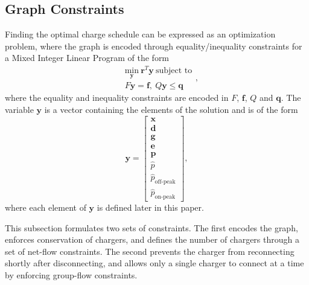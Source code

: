 \subsection{Graph Constraints}
\par Finding the optimal charge schedule can be expressed as an optimization problem, where the graph is encoded through equality/inequality constraints for a Mixed Integer Linear Program of the form 
\begin{equation}
	\begin{aligned}
		& \underset{\mathbf{y}}{\text{min}}\ \mathbf{r}^T\mathbf{y} \ \text{subject to} \\
		& F\mathbf{y} = \mathbf{f}, \ Q\mathbf{y} \le \mathbf{q}
	\end{aligned},
\end{equation}
where the equality and inequality constraints are encoded in $F$, $\mathbf{f}$, $Q$ and $\mathbf{q}$. The variable $\mathbf{y}$ is a vector containing the elements of the solution and is of the form 
\begin{equation}\label{eqn:y}
		\mathbf{y} = \begin{bmatrix}
		\mathbf{x} \\
		\mathbf{d} \\
		\mathbf{g} \\
		\mathbf{e} \\
		\mathbf{p} \\
		\hat{p} \\
		\hat{p}_\text{off-peak} \\
		\hat{p}_\text{on-peak} 
	\end{bmatrix},
\end{equation}
where each element of $\mathbf{y}$ is defined later in this paper.
\par  This subsection formulates two sets of constraints.  The first encodes the graph, enforces conservation of chargers, and defines the number of chargers through a set of net-flow constraints. The second prevents the charger from reconnecting shortly after disconnecting, and allows only a single charger to connect at a time by enforcing group-flow constraints.
